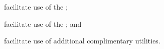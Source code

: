 \begin{description}
  \item facilitate use of the \varCommandLineInterface;
  \item facilitate use of the \varApplicationProgramInterface; and
  \item facilitate use of additional complimentary utilities.
\end{description}